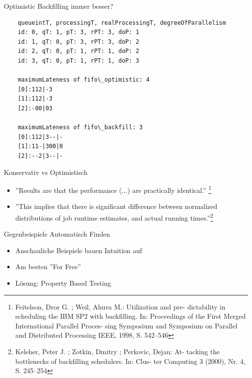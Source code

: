 \documentclass[aspectratio=169,10pt]{beamer}
\begin{document}
\begin{frame}[t,fragile]{Optimistic Backfilling immer besser?}
\small
\begin{verbatim}	
	queueintT, processingT, realProcessingT, degreeOfParallelism
	id: 0, qT: 1, pT: 3, rPT: 3, doP: 1
	id: 1, qT: 0, pT: 3, rPT: 3, doP: 2
	id: 2, qT: 0, pT: 1, rPT: 1, doP: 2
	id: 3, qT: 0, pT: 1, rPT: 1, doP: 3

	maximumLateness of fifo\_optimistic: 4
	[0]:112|-3
	[1]:112|-3
	[2]:-00|03
	
	maximumLateness of fifo\_backfill: 3
	[0]:112|3--|-
	[1]:11-|300|0
	[2]:--2|3--|-
\end{verbatim}
\end{frame}


\begin{frame}[t, fragile]{Konservativ vs Optimistisch}
	\begin{itemize}[<+->]
		\item 
		''Results are that the performance (...) are practically identical.''	\footnote{Feitelson, Dror G. ; Weil, Ahuva M.: Utilization and pre-
			dictability in scheduling the IBM SP2 with backfilling. In:
			Proceedings of the First Merged International Parallel Proces-
			sing Symposium and Symposium on Parallel and Distributed
			Processing IEEE, 1998, S. 542–546}
		\item''This implies that there is significant difference between normalized distributions of job runtime estimates, and actual
		running times.''\footnote{Keleher, Peter J. ; Zotkin, Dmitry ; Perkovic, Dejan: At-
			tacking the bottlenecks of backfilling schedulers. In: Clus-
			ter Computing 3 (2000), Nr. 4, S. 245–254}
	\end{itemize}
\end{frame}

\begin{frame}[t,fragile]{Gegenbeispiele Automatisch Finden}
	\begin{itemize}[<+->]
		\item \alert{Anschauliche} Beispiele bauen Intuition auf
		\item Am besten ''For Free''
		\item L\"osung: \alert{Property Based Testing}
	\end{itemize}
\end{frame}
\end{document}
